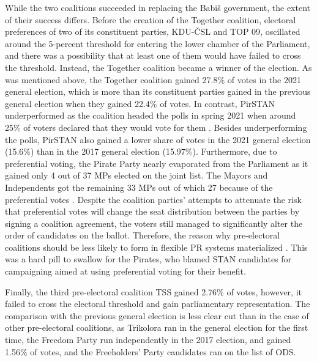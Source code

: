 \documentclass[]{interact}
\theoremstyle{plain}%
\theoremstyle{definition}
\theoremstyle{remark}
\begin{document}
While the two coalitions succeeded in replacing the Babiš government, the extent of their success differs. Before the creation of the Together coalition, electoral preferences of two of its constituent parties, KDU-ČSL and TOP 09, oscillated around the 5-percent threshold for entering the lower chamber of the Parliament, and there was a possibility that at least one of them would have failed to cross the threshold. Instead, the Together coalition became a winner of the election. As was mentioned above, the Together coalition gained 27.8\% of votes in the 2021 general election, which is more than its constituent parties gained in the previous general election when they gained 22.4\% of votes. 
In contrast, PirSTAN underperformed as the coalition headed the polls in spring 2021 when around 25\% of voters declared that they would vote for them \citep[see e.g.][]{linek2022}. Besides underperforming the polls, PirSTAN also gained a lower share of votes in the 2021 general election (15.6\%) than in the 2017 general election (15.97\%).
Furthermore, due to preferential voting, the Pirate Party nearly evaporated from the Parliament as it gained only 4 out of 37 MPs elected on the joint list. The Mayors and Independents got the remaining 33 MPs out of which 27 because of the preferential votes \citep[15]{maskarinec2022}. Despite the coalition parties' attempts to attenuate the risk that preferential votes will change the seat distribution between the parties by signing a coalition agreement, the voters still managed to significantly alter the order of candidates on the ballot. Therefore, the reason why pre-electoral coalitions should be less likely to form in flexible PR systems materialized \citep{ibenskas2016}. This was a hard pill to swallow for the Pirates, who blamed STAN candidates for campaigning aimed at using preferential voting for their benefit. 

Finally, the third pre-electoral coalition TSS gained 2.76\% of votes, however, it failed to cross the electoral threshold and gain parliamentary representation. The comparison with the previous general election is less clear cut than in the case of other pre-electoral coalitions, as Trikolora ran in the general election for the first time, the Freedom Party run independently in the 2017 election, and gained 1.56\% of votes, and the Freeholders' Party candidates ran on the list of ODS.
\end{document}
